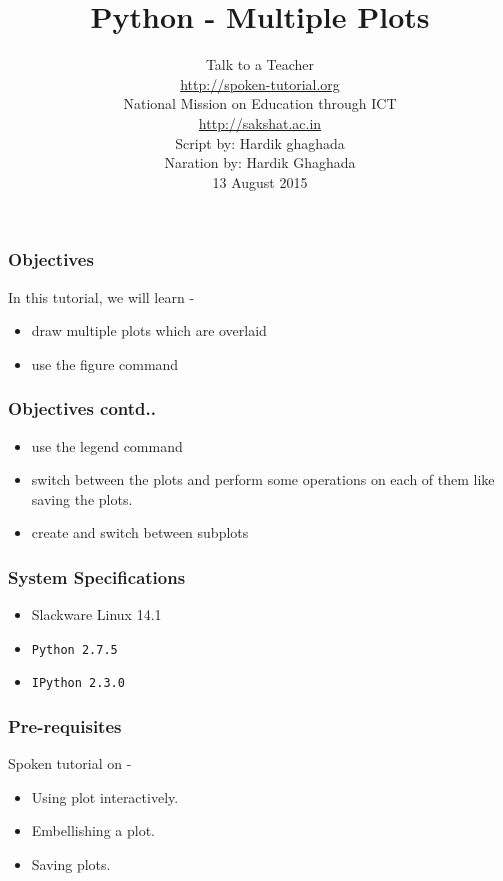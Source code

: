 \documentclass[17pt,compress]{beamer}
\author[FOSSEE]{}
\institute[IIT Bombay]{}
\date[]{}
\begin{document}
\sffamily \bfseries
\title
[Multiple Plots]
{Python - Multiple Plots}
\author
[FOSSEE, IIT - Bombay]
{\small Talk to a Teacher\\{\color{blue}\url{http://spoken-tutorial.org}}\\National Mission on Education
 through ICT\\{\color{blue}\url{http://sakshat.ac.in}} \\[0.5cm]{\tiny Script by: Hardik ghaghada \\ Naration by: Hardik Ghaghada \\ 13 August 2015}}

\begin{frame}
   \titlepage
\end{frame}
\begin{frame}
\frametitle{Objectives}
\label{sec-2.1}
In this tutorial, we will learn - \pause
\begin{itemize}
\item draw multiple plots which are overlaid\pause
\item use the figure command\end{itemize}
\end{frame}
\begin{frame}
\frametitle{Objectives contd..}
\label{sec-2.2}
\begin{itemize}
\item use the legend command\pause
\item switch between the plots and perform some operations on each of them like saving the plots.\pause
\item create and switch between subplots
\end{itemize}
\end{frame}
\begin{frame}
\frametitle{System Specifications}\pause
\begin{itemize}
\item Slackware Linux 14.1\pause
\item \texttt{Python 2.7.5} \pause
\item \texttt{IPython 2.3.0}
\end{itemize}
\end{frame}
\begin{frame}
\frametitle{Pre-requisites}
\label{sec-3}
Spoken tutorial on -
\begin{itemize}
\item Using plot interactively.\pause
\item Embellishing a plot.\pause
\item Saving plots.
\end{itemize}
\end{frame}
\end{document}
